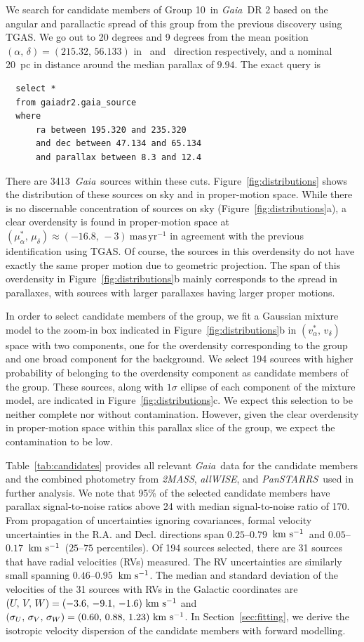 \documentclass[modern,letterpaper]{aastex61}
\newcommand{\project}[1]{\textsl{#1}}
\newcommand{\acronym}[1]{{\small{#1}}}
\newcommand{\gaia}{\project{Gaia}}
\newcommand{\tmass}{\project{\acronym{2MASS}}}
\newcommand{\allwise}{\project{\acronym{allWISE}}}
\newcommand{\panstarrs}{\project{\acronym{PanSTARRS}}}
\newcommand{\sectionname}{Section}
\newcommand{\figname}{Figure}
\newcommand{\tgas}{\acronym{TGAS}}
\newcommand{\groupTen}{Group 10}
\newcommand{\kms}{\ensuremath{\rm km~s^{-1}}}
\newcommand{\ra}{\text{R.A.}}
\newcommand{\dec}{\text{Decl.}}
\newcommand{\pmra}{\ensuremath{\mu_\alpha^*}}
\newcommand{\pmdec}{\ensuremath{\mu_\delta}}
\newcommand{\masyr}{\ensuremath{\mathrm{mas}\,\mathrm{yr}^{-1}}}
\newcommand{\nstarsInRegion}{3413}
\begin{document}
We search for candidate members of \groupTen\ in \gaia\ DR 2
based on the angular and parallactic spread of this group from the previous
discovery using \tgas.
We go out to 20 degrees and 9 degrees from the mean position
$(\alpha,\,\delta) = (215.32,\,56.133)$
in \ra\ and \dec\ direction respectively,
and a nominal 20~pc in distance around the median parallax of $9.94$.
The exact query is
\begin{verbatim}
  select *
  from gaiadr2.gaia_source
  where
      ra between 195.320 and 235.320
      and dec between 47.134 and 65.134
      and parallax between 8.3 and 12.4
\end{verbatim}
There are \nstarsInRegion\ \gaia\ sources within these cuts.
Figure~\ref{fig:distributions} shows the distribution of these sources on sky
and in proper-motion space.
While there is no discernable concentration of sources on sky
(\figname~\ref{fig:distributions}a),
a clear overdensity is found in proper-motion space at
$(\pmra,\,\pmdec)\approx(-16.8,\,-3)~\masyr$ in agreement with the previous
identification using \tgas.
Of course, the sources in this overdensity do not have exactly the same proper
motion due to geometric projection.
The span of this overdensity in \figname~\ref{fig:distributions}b
mainly corresponds to the spread in parallaxes,
with sources with larger parallaxes having larger proper motions.

In order to select candidate members of the group,
we fit a Gaussian mixture model to the zoom-in box indicated in
\figname~\ref{fig:distributions}b in $(v_\alpha^*,\,v_\delta)$ space
with two components, one for the overdensity corresponding to the group and
one broad component for the background.
We select 194 sources with higher probability of belonging to the overdensity
component as candidate members of the group.
These sources, along with $1\sigma$ ellipse of each component of the mixture model,
are indicated in \figname~\ref{fig:distributions}c.
We expect this selection to be neither complete nor without contamination.
However, given the clear overdensity in proper-motion space within this parallax slice
of the group, we expect the contamination to be low.

Table~\ref{tab:candidates} provides all relevant \gaia\ data for the candidate members
and the combined photometry from \tmass, \allwise, and \panstarrs\
used in further analysis.
We note that 95\% of the selected candidate members have parallax
signal-to-noise ratios above 24 with median signal-to-noise ratio of 170.
From propagation of uncertainties ignoring covariances,
formal velocity uncertainties in the R.A. and Decl. directions span
$0.25$--$0.79$~\kms\ and $0.05$--$0.17$~\kms\ ($25$--$75$ percentiles).
Of 194 sources selected, there are 31 sources that have radial velocities (RVs)
measured.
The RV uncertainties are similarly small spanning $0.46$--$0.95$~\kms.
The median and standard deviation of the velocities of the 31 sources with RVs in the Galactic coordinates are $(U,\,V,\,W) = (-3.6,\,-9.1,\,-1.6)~\kms$ and $(\sigma_U,\,\sigma_V,\,\sigma_W) = (0.60,\,0.88,\,1.23)~\kms$.
In \sectionname~\ref{sec:fitting}, we derive
the isotropic velocity dispersion of the candidate members with
forward modelling.
\end{document}
